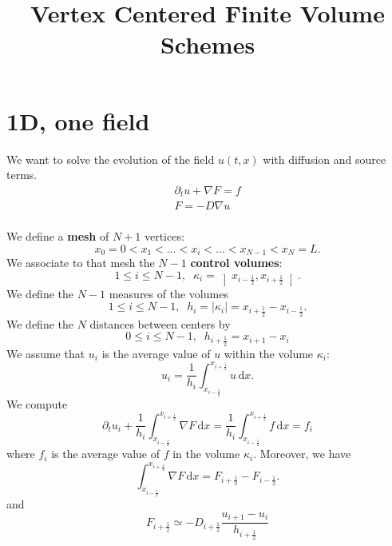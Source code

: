 \documentclass[aps,onecolumn]{revtex4}
\newcommand{\half}{\frac{1}{2}}
\newcommand{\myd}{\,\text{d}}
\begin{document}
\title{Vertex Centered Finite Volume Schemes}

\maketitle

\section{1D, one field}
We want to solve the evolution of the field $u(t,x)$ with diffusion and source terms.
\begin{equation}
	\begin{array}{l}
		\partial_t u + \nabla F = f\\
		F = -D \nabla u\\
	\end{array}
\end{equation}

We define a {\bf mesh} of $N+1$ vertices:
\begin{equation}
x_0=0<x_1<\ldots<x_i<\ldots<x_{N-1}<x_N=L.
\end{equation}
We associate to that mesh the $N-1$ {\bf control volumes}:
\begin{equation}
 1\leq i \leq N-1, \;\; \kappa_{i}=\left\rbrack x_{i-\half}, x_{i+\half}\right\lbrack.
\end{equation}
We define the $N-1$ measures of the volumes
\begin{equation}
 1\leq i \leq N-1, \;\; h_i=\vert \kappa_i \vert=x_{i+\half} - x_{i-\half}.
\end{equation}
We define the $N$ distances between centers by
\begin{equation}
	0\leq i \leq N-1,\;\; h_{i+\half} = x_{i+1} - x_{i}
\end{equation}
We assume that $u_i$ is the average value of $u$ within the volume $\kappa_i$:
\begin{equation}
	u_i = \dfrac{1}{h_i}\int_{x_{i-\half}}^{x_{i+\half}} u\myd x.
\end{equation}
We compute
\begin{equation}
	\partial_t u_i + \dfrac{1}{h_i} \int_{x_{i-\half}}^{x_{i+\half}} \nabla F \myd x = \dfrac{1}{h_i} \int_{x_{i-\half}}^{x_{i+\half}} f \myd x = f_i
\end{equation}
where $f_i$ is the average value of $f$ in the volume $\kappa_i$.
Moreover, we have
\begin{equation}
	\int_{x_{i-\half}}^{x_{i+\half}} \nabla F \myd x = F_{i+\half} - F_{i-\half}.
\end{equation}
and
\begin{equation}
	F_{i+\half} \simeq - D_{i+\half} \dfrac{u_{i+1}-u_{i}}{h_{i+\half}} 
\end{equation}
\end{document}
